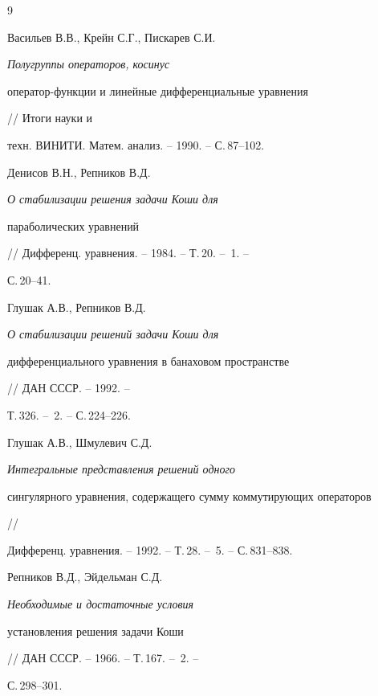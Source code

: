 \begin{thebibliography}{9} 


 




Васильев В.В., Крейн С.Г., Пискарев С.И. {\em Полугруппы операторов, косинус 


оператор-функции и линейные дифференциальные уравнения} // Итоги науки и 


техн. ВИНИТИ. Матем. анализ. -- 1990. -- С.\,87--102. 


 




Денисов В.Н., Репников В.Д. {\em О стабилизации решения задачи Коши для 


параболических уравнений} 


// Дифференц. уравнения. -- 1984. -- Т.\,20. -- \No\,1. -- 


С.\,20--41. 


 




Глушак А.В., Репников В.Д. {\em О стабилизации решений задачи Коши для 


дифференциального уравнения в банаховом пространстве} 


// ДАН СССР. -- 1992. -- 


Т.\,326. -- \No\,2. -- С.\,224--226. 


 




Глушак А.В., Шмулевич С.Д. {\em Интегральные представления решений одного 


сингулярного уравнения, содержащего сумму коммутирующих операторов} // 


Дифференц. уравнения. -- 1992. -- Т.\,28. -- \No\,5. -- С.\,831--838. 


 




Репников В.Д., Эйдельман С.Д. {\em Необходимые и достаточные условия 


установления решения задачи Коши} 


// ДАН СССР. -- 1966. -- Т.\,167. -- \No\,2. -- 


С.\,298--301. 


 


\end{thebibliography} 


 


\vskip 2cm 


 






 


 


